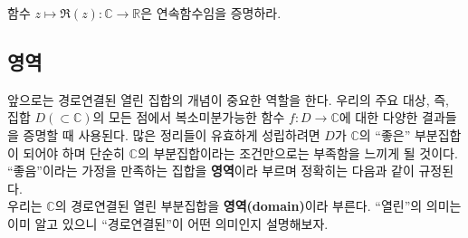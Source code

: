 \begin{salt_exercise} \label{ex-1-28}
함수 $z\mapsto \Re(z): \mathbb C \to \mathbb R$은 연속함수임을 증명하라. 
\end{salt_exercise}

\subsection{영역 \label{sec-1-3-4}}

앞으로는  경로연결된 열린 집합의 개념이 중요한 역할을 한다.
우리의 주요 대상, 즉, 집합 $D(\subset \mathbb C)$의 모든 점에서
복소미분가능한 함수 $f:D\to\mathbb C$에 대한 다양한 결과들을 증명할 때 사용된다.
많은 정리들이 유효하게 성립하려면 $D$가 $\mathbb C$의 ``좋은'' 부분집합이 되어야 하며
단순히 $\mathbb C$의 부분집합이라는 조건만으로는 부족함을 느끼게 될 것이다.
``좋음''이라는 가정을 만족하는 집합을 \textbf{영역}이라 부르며 정확히는 다음과 같이 규정된다. 
\\[1ex]
우리는 $\mathbb C$의 경로연결된 열린 부분집합을 \textbf{영역(domain)}이라 부른다.
``열린''의 의미는 이미 알고 있으니 ``경로연결된''이 어떤 의미인지 설명해보자.

